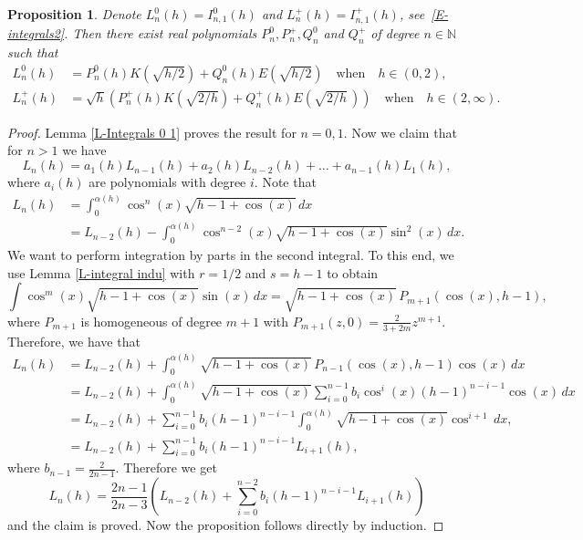 \documentclass[12pt,psamsfonts]{amsart}
\newtheorem {proposition} [theorem]{Proposition}
\begin{document}
\begin{proposition}
\label{P-Ln Elliptic}
    Denote $L^0_n(h)=I^0_{n,1}(h)$ and $L^+_n(h)=I^+_{n,1}(h)$, see~\eqref{E-integrals2}.
    Then there exist real polynomials  $P^0_n,P^+_n, Q^0_n$ and $Q^+_n$ of degree $n\in{\mathbb{N}}$
     such that
\begin{align*}
 L^0 _n(h)&=  P^0 _n(h) K\left(\sqrt{{h}/{2}}\right)
  + Q^0 _n(h) E\left(\sqrt{{h}/{2}}\right)\quad \mbox{when} \quad h\in(0,2),\\
 L^+_n(h)&= \sqrt{h} \left(P^+_n(h) K\left(\sqrt{{2}/{h}}\right)
+ Q^+_n(h) E\left(\sqrt{{2}/{h}}\,\right)\right) \quad \mbox{when} \quad h\in(2,\infty).
\end{align*}
\end{proposition}

\begin{proof}
Lemma \ref{L-Integrals 0 1} proves the result  for $n=0,1.$ Now we
claim that for $n>1$ we have
\begin{equation*}
    L_n(h) =a_{1}(h) L_{n-1}(h) +  a_{2}(h) L_{n-2}(h) + \dots +  a_{n-1}(h)L_1(h),
\end{equation*}
where $a_i(h)$ are polynomials with degree $i$. Note that
\begin{align*}
    L_n(h) &=\int_0^{{\alpha}(h)} \cos^n(x) \sqrt{h-1+\cos(x)} \, dx \\
               &=L_{n-2}(h) -  \int_0^{{\alpha}(h)} \cos^{n-2}(x) \sqrt{h-1+\cos(x)} \sin^2(x)\, dx.
\end{align*}
We want to perform integration by parts in the second integral. To
this end, we use Lemma \ref{L-integral indu} with $r=1/2$ and
$s=h-1$ to obtain
\begin{equation*}
    \int \cos^{m}(x) \sqrt{h-1+\cos(x)} \sin(x)\, dx = \sqrt{h-1+\cos(x)}\, P_{m+1}(\cos(x),h-1),
\end{equation*}
where $P_{m+1}$ is homogeneous of degree $m+1$ with $P_{m+1}(z,0) =
\frac{2}{3+2m} z^{m+1}.$ Therefore, we have that
\begin{align*}
    L_n(h) &=L_{n-2}(h) + \int_0^{{\alpha}(h)} \sqrt{h-1+\cos(x)}\, P_{n-1}(\cos(x),h-1) \cos(x)\, dx\\
              &=L_{n-2}(h) + \int_0^{{\alpha}(h)}\sqrt{h-1+\cos(x)}
                                      \sum_{i=0}^{n-1} b_i \cos^i(x) (h-1)^{n-i-1} \cos(x)\, dx\\
              &=L_{n-2}(h) + \sum_{i=0}^{n-1} b_i (h-1)^{n-i-1}
                                      \int_0^{{\alpha}(h)}\sqrt{h-1+\cos(x)} \cos^{i+1}\, dx,\\
              &=L_{n-2}(h) + \sum_{i=0}^{n-1} b_i (h-1)^{n-i-1} L_{i+1}(h),
\end{align*}
where $b_{n-1} = \frac{2}{2n-1}.$ Therefore we get
$$L_n(h)=\frac{2n-1}{2n-3}\left(L_{n-2}(h) + \sum_{i=0}^{n-2} b_i (h-1)^{n-i-1}
L_{i+1}(h)\right)$$ and the claim is proved. Now the proposition
follows directly by induction.
\end{proof}
\end{document}
